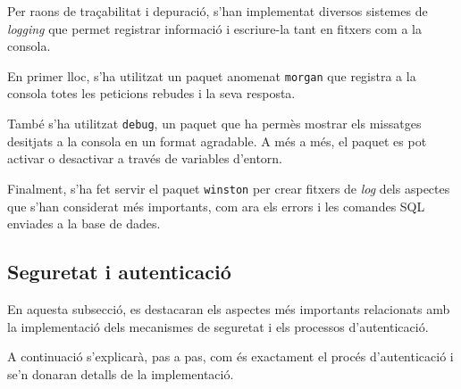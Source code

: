 \documentclass[a4paper,12pt]{ThesisStyle}
\begin{document}
Per raons de traçabilitat i depuració, s'han implementat diversos sistemes de \textit{logging} que permet registrar informació i escriure-la tant en fitxers com a la consola.

En primer lloc, s'ha utilitzat un paquet anomenat \texttt{morgan} que registra a la consola totes les peticions rebudes i la seva resposta.

També s'ha utilitzat \texttt{debug}, un paquet que ha permès mostrar els missatges desitjats a la consola en un format agradable. A més a més, el paquet es pot activar o desactivar a través de variables d'entorn.

Finalment, s'ha fet servir el paquet \texttt{winston} per crear fitxers de \textit{log} dels aspectes que s'han considerat més importants, com ara els errors i les comandes SQL enviades a la base de dades.

\subsection{Seguretat i autenticació}
\label{subsec:seguretat}

En aquesta subsecció, es destacaran els aspectes més importants relacionats amb la implementació dels mecanismes de seguretat i els processos d'autenticació.

A continuació s'explicarà, pas a pas, com és exactament el procés d'autenticació i se'n donaran detalls de la implementació.
\end{document}
